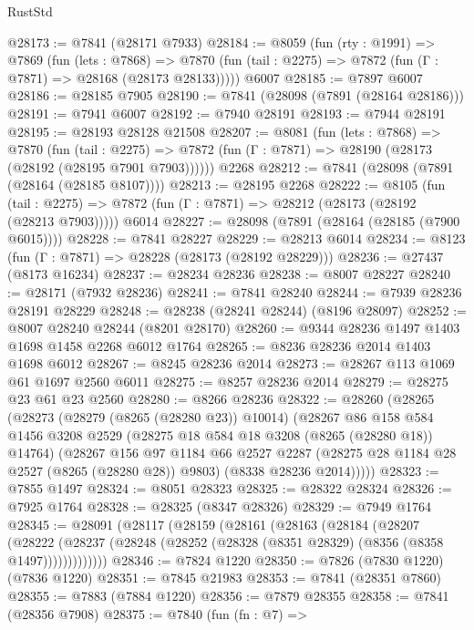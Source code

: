 \begin{lexlean}{RustStd}
\begin{coremodule}
@28173 := @7841 (@28171 @7933)
@28184 := @8059
    (fun (rty : @1991) =>
    @7869
      (fun (lets : @7868) =>
      @7870 (fun (tail : @2275) => @7872 (fun (Γ : @7871) => @28168 (@28173 @28133)))))
    @6007
@28185 := @7897 @6007
@28186 := @28185 @7905
@28190 := @7841 (@28098 (@7891 (@28164 @28186)))
@28191 := @7941 @6007
@28192 := @7940 @28191
@28193 := @7944 @28191
@28195 := @28193 @28128 @21508
@28207 := @8081
    (fun (lets : @7868) =>
    @7870
      (fun (tail : @2275) =>
      @7872 (fun (Γ : @7871) => @28190 (@28173 (@28192 (@28195 @7901 @7903))))))
    @2268
@28212 := @7841 (@28098 (@7891 (@28164 (@28185 @8107))))
@28213 := @28195 @2268
@28222 := @8105
    (fun (tail : @2275) => @7872 (fun (Γ : @7871) => @28212 (@28173 (@28192 (@28213 @7903)))))
    @6014
@28227 := @28098 (@7891 (@28164 (@28185 (@7900 @6015))))
@28228 := @7841 @28227
@28229 := @28213 @6014
@28234 := @8123 (fun (Γ : @7871) => @28228 (@28173 (@28192 @28229)))
@28236 := @27437 (@8173 @16234)
@28237 := @28234 @28236
@28238 := @8007 @28227
@28240 := @28171 (@7932 @28236)
@28241 := @7841 @28240
@28244 := @7939 @28236 @28191 @28229
@28248 := @28238 (@28241 @28244) (@8196 @28097)
@28252 := @8007 @28240 @28244 (@8201 @28170)
@28260 := @9344 @28236 @1497 @1403 @1698 @1458 @2268 @6012 @1764
@28265 := @8236 @28236 @2014 @1403 @1698 @6012
@28267 := @8245 @28236 @2014
@28273 := @28267 @113 @1069 @61 @1697 @2560 @6011
@28275 := @8257 @28236 @2014
@28279 := @28275 @23 @61 @23 @2560
@28280 := @8266 @28236
@28322 := @28260
    (@28265
      (@28273
        (@28279 (@8265 (@28280 @23)) @10014)
        (@28267
          @86
          @158
          @584
          @1456
          @3208
          @2529
          (@28275 @18 @584 @18 @3208 (@8265 (@28280 @18)) @14764)
          (@28267
            @156
            @97
            @1184
            @66
            @2527
            @2287
            (@28275 @28 @1184 @28 @2527 (@8265 (@28280 @28)) @9803)
            (@8338 @28236 @2014)))))
@28323 := @7855 @1497
@28324 := @8051 @28323
@28325 := @28322 @28324
@28326 := @7925 @1764
@28328 := @28325 (@8347 @28326)
@28329 := @7949 @1764
@28345 := @28091
    (@28117
      (@28159
        (@28161
          (@28163
            (@28184
              (@28207
                (@28222
                  (@28237 (@28248 (@28252 (@28328 (@8351 @28329) (@8356 (@8358 @1497)))))))))))))
@28346 := @7824 @1220
@28350 := @7826 (@7830 @1220) (@7836 @1220)
@28351 := @7845 @21983
@28353 := @7841 (@28351 @7860)
@28355 := @7883 (@7884 @1220)
@28356 := @7879 @28355
@28358 := @7841 (@28356 @7908)
@28375 := @7840
    (fun (fn : @7) =>

\end{coremodule}
\end{lexlean}
